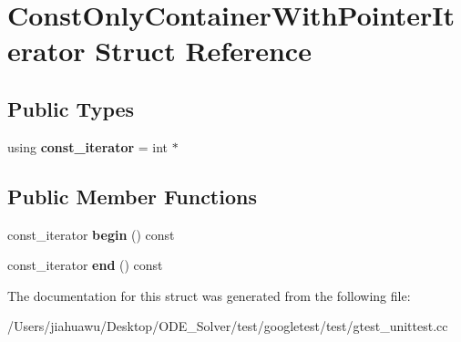 \hypertarget{struct_const_only_container_with_pointer_iterator}{}\section{Const\+Only\+Container\+With\+Pointer\+Iterator Struct Reference}
\label{struct_const_only_container_with_pointer_iterator}
\subsection*{Public Types}
\begin{DoxyCompactItemize}
\item 
\mbox{\label{struct_const_only_container_with_pointer_iterator_a652efbd2c6da61e65cc45123e4182713}} 
using {\bfseries const\+\_\+iterator} = int $\ast$
\end{DoxyCompactItemize}
\subsection*{Public Member Functions}
\begin{DoxyCompactItemize}
\item 
\mbox{\label{struct_const_only_container_with_pointer_iterator_a3dd48a5028ca3c3bed0a10d7c5fa938b}} 
const\+\_\+iterator {\bfseries begin} () const
\item 
\mbox{\label{struct_const_only_container_with_pointer_iterator_a041683280e1319a08467fa9035098cff}} 
const\+\_\+iterator {\bfseries end} () const
\end{DoxyCompactItemize}


The documentation for this struct was generated from the following file\+:\begin{DoxyCompactItemize}
\item 
/\+Users/jiahuawu/\+Desktop/\+O\+D\+E\+\_\+\+Solver/test/googletest/test/gtest\+\_\+unittest.\+cc\end{DoxyCompactItemize}
